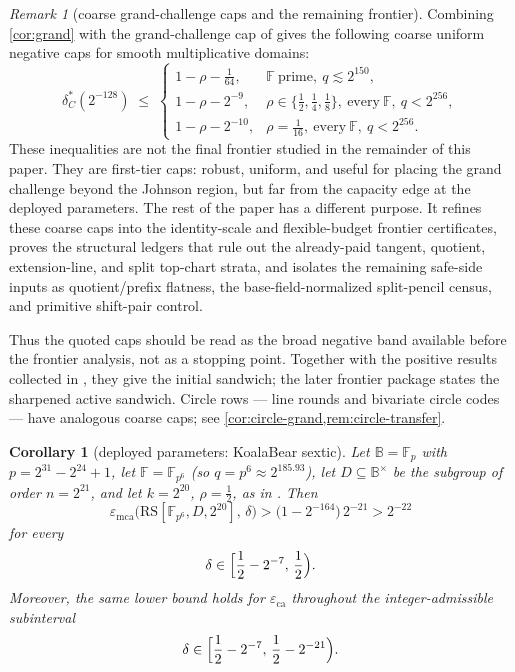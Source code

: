 \documentclass[11pt]{article}
\newtheorem{corollary}[corollary]{Corollary}
\theoremstyle{definition}
\theoremstyle{remark}
\newtheorem{remark}[remark]{Remark}
\newcommand{\F}{\mathbb{F}}
\newcommand{\B}{\mathbb{B}}
\newcommand{\RS}{\mathrm{RS}}
\newcommand{\eca}{\varepsilon_{\mathrm{ca}}}
\newcommand{\emca}{\varepsilon_{\mathrm{mca}}}
\begin{document}
\begin{remark}[coarse grand-challenge caps and the remaining frontier]\label{rem:twotier}
Combining \cref{cor:grand} with the grand-challenge cap of \cite[Prop.\ ``Grand-challenge cap'']{Cho26b} gives the following coarse uniform negative caps for smooth multiplicative domains:
\[
\delta^*_C(2^{-128})\;\le\;
\begin{cases}
1-\rho-\frac1{64}, & \F\ \text{prime},\ q\lesssim2^{150},\\[2pt]
1-\rho-2^{-9}, & \rho\in\{\frac12,\frac14,\frac18\},\ \text{every}\ \F,\ q<2^{256},\\[2pt]
1-\rho-2^{-10}, & \rho=\frac1{16},\ \text{every}\ \F,\ q<2^{256}.
\end{cases}
\]
These inequalities are not the final frontier studied in the remainder of this paper.  They are first-tier caps: robust, uniform, and useful for placing the grand challenge beyond the Johnson region, but far from the capacity edge at the deployed parameters.  The rest of the paper has a different purpose.  It refines these coarse caps into the identity-scale and flexible-budget frontier certificates, proves the structural ledgers that rule out the already-paid tangent, quotient, extension-line, and split top-chart strata, and isolates the remaining safe-side inputs as quotient/prefix flatness, the base-field-normalized split-pencil census, and primitive shift-pair control.

Thus the quoted caps should be read as the broad negative band available before the frontier analysis, not as a stopping point.  Together with the positive results collected in \cite[Table~1]{ABF26}, they give the initial sandwich; the later frontier package states the sharpened active sandwich.  Circle rows --- line rounds and bivariate circle codes --- have analogous coarse caps; see \cref{cor:circle-grand,rem:circle-transfer}.
\end{remark}

\begin{corollary}[deployed parameters: KoalaBear sextic]\label{cor:deployed}
Let $\B=\F_p$ with $p=2^{31}-2^{24}+1$, let $\F=\F_{p^6}$ (so $q=p^6\approx2^{185.93}$), let $D\subseteq\B^\times$ be the subgroup of order $n=2^{21}$, and let $k=2^{20}$, $\rho=\frac12$, as in \cite[\S6.3]{ABF26}. Then
\[
\emca\bigl(\RS[\F_{p^6},D,2^{20}],\,\delta\bigr)
>
\bigl(1-2^{-164}\bigr)\,2^{-21}
>
2^{-22}
\]
for every
\[
        \delta\in\Bigl[\frac12-2^{-7},\,\frac12\Bigr).
\]
Moreover, the same lower bound holds for $\eca$ throughout the integer-admissible subinterval
\[
        \delta\in
        \Bigl[\frac12-2^{-7},\,\frac12-2^{-21}\Bigr).
\]
\end{corollary}
\end{document}

